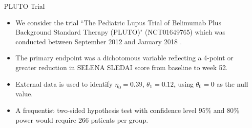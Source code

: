 \documentclass{beamer}
\begin{document}
\begin{frame}{PLUTO Trial}
\begin{itemize}
\item
We consider the trial ``The Pediatric Lupus Trial of Belimumab Plus Background Standard Therapy (PLUTO)" (NCT01649765) which was conducted between September 2012 and January 2018 \citep{Brunner2020}.
\item
The primary endpoint was a dichotomous variable reflecting a 4-point or greater reduction in SELENA SLEDAI score from baseline to week 52. 
\item External data is used to identify $\eta_0=0.39$, $\theta_1=0.12$, using $\theta_0=0$ as the null value.
\item A frequentist two-sided hypothesis test with confidence level $95\%$ and $80\%$ power would require 266 patients per group.
\end{itemize}
\end{frame}





%
\end{document}
